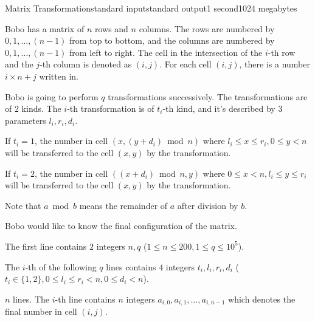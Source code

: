 \begin{problem}{Matrix Transformation}{standard input}{standard output}{1 second}{1024 megabytes}

Bobo has a matrix of $n$ rows and $n$ columns.
The rows are numbered by $0, 1, \dots, (n - 1)$ from top to bottom,
and the columns are numbered by $0, 1, \dots, (n - 1)$ from left to right.
The cell in the intersection of the $i$-th row and the $j$-th column is denoted as $(i, j)$.
For each cell $(i, j)$, there is a number $i \times n + j$ written in.

Bobo is going to perform $q$ transformations successively.
The transformations are of $2$ kinds. 
The $i$-th transformation is of $t_i$-th kind, and it's described by $3$ parameters $l_i, r_i, d_i$.

If $t_i = 1$, the number in cell $(x, (y + d_i) \bmod n)$ where $l_i \leq x \leq r_i, 0 \leq y < n$ will be transferred to the cell $(x, y)$ by the transformation. 

If $t_i = 2$, the number in cell $((x + d_i) \bmod n, y)$ where $0 \leq x < n, l_i \leq y \leq r_i$ will be transferred to the cell $(x, y)$ by the transformation. 

Note that $a \bmod b$ means the remainder of $a$ after division by $b$.

Bobo would like to know the final configuration of the matrix.

\InputFile
The first line contains $2$ integers $n, q$ ($1 \leq n \leq 200, 1 \leq q \leq 10^5$). 

The $i$-th of the following $q$ lines contains $4$ integers $t_i, l_i, r_i, d_i$ ($t_i \in \{1, 2\}, 0 \leq l_i \leq r_i < n, 0 \leq d_i < n$). 

\OutputFile
$n$ lines. The $i$-th line contains $n$ integers $a_{i, 0}, a_{i, 1}, \dots, a_{i, n - 1}$ which denotes the final number in cell $(i, j)$.

\Examples

\begin{example}
%
%
\end{example}

\end{problem}

